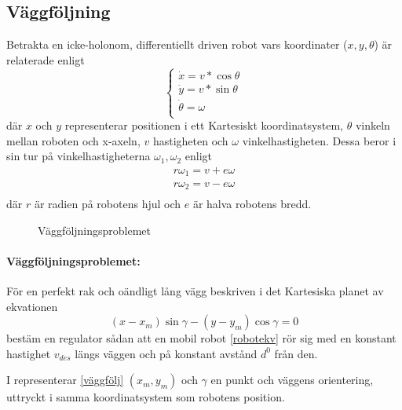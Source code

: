\documentclass[11pt]{article}
\begin{document}
\begin{flushleft}
\subsection{Väggföljning}\label{väggföljning}
Betrakta en icke-holonom, differentiellt driven robot vars koordinater (\(x, y, \theta\)) är relaterade enligt
\begin{equation}\label{robotekv}
	\begin{cases}
  	\dot{x} = v * \cos \theta \\
  	\dot{y} = v * \sin \theta \\
   	 \dot{\theta} = \omega \\
  	\end{cases}
\end{equation}
där \(x\) och \(y\) representerar positionen i ett Kartesiskt koordinatsystem, \(\theta\) vinkeln mellan roboten och x-axeln, \(v\) hastigheten och \(\omega\) vinkelhastigheten. Dessa beror i sin tur på vinkelhastigheterna \(\omega_1, \omega_2\) enligt
\begin{equation}\label{hjulekv}
	\begin{aligned}
	r\omega_1 = v + e\omega \\
	r\omega_2 = v - e\omega \\
	\end{aligned}
\end{equation}
där \(r\) är radien på robotens hjul och \(e\) är halva robotens bredd.

\begin{figure}[H] %
\centering
\noindent{}
	\caption{Väggföljningsproblemet\label{robot}}	
\end{figure}

\paragraph{Väggföljningsproblemet:} 
\begin{it}
För en perfekt rak och oändligt lång vägg beskriven i det Kartesiska planet av ekvationen
\begin{equation}\label{väggfölj}
	(x - x_m) \sin\gamma - (y - y_m) \cos \gamma = 0
\end{equation}
bestäm en regulator sådan att en mobil robot \eqref{robotekv} rör sig med en konstant hastighet \(v_{des}\) längs väggen och på konstant avstånd \(d^0\) från den.
\end{it}

I representerar \eqref{väggfölj} \((x_m, y_m)\) och \(\gamma\) en punkt och väggens orientering, uttryckt i samma koordinatsystem som robotens position.


\end{flushleft}
\end{document}
